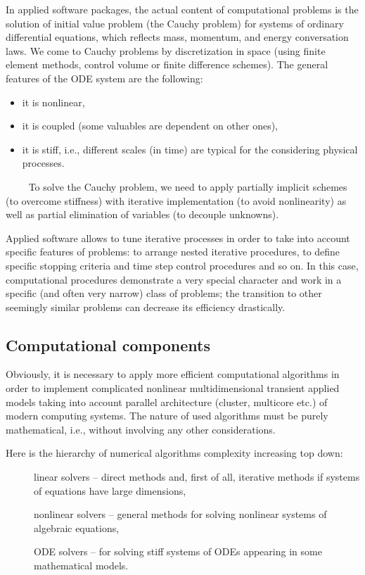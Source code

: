 \documentclass{elsarticle}
\begin{document}
In applied software packages, the actual content of computational problems is the solution of initial value problem 
(the Cauchy problem) for systems of ordinary differential equations, which reflects mass, momentum, and 
energy conversation laws. 
We come to Cauchy problems by discretization in space (using finite element methods, 
control volume or finite difference schemes). 
The general features of the ODE system are the following:
\begin{itemize}
 \item[\textbullet]	it is nonlinear,  
 \item[\textbullet] 	it is coupled  (some valuables are dependent on other ones),
 \item[\textbullet]  it is stiff, i.e., different scales (in time) are typical for the considering physical processes.  
\end{itemize} 
~~~~
To solve the Cauchy problem, we need to apply partially implicit schemes (to overcome stiffness) 
with iterative implementation (to avoid nonlinearity) as well as partial elimination of variables 
(to decouple unknowns). 

Applied software allows to tune iterative processes in order to  take into account specific features of problems: 
to arrange nested iterative procedures, to define specific stopping criteria and  time step control procedures and so on.
In this case, computational procedures demonstrate a very special character and work in a specific 
(and often very narrow) class of problems; the transition to other seemingly similar problems can decrease its efficiency
drastically.

\subsection{Computational components}

Obviously, it is necessary to apply more efficient computational algorithms in order to implement 
complicated nonlinear multidimensional transient applied models taking into account parallel architecture 
(cluster, multicore etc.) of modern computing systems.
The nature of used algorithms must be purely mathematical, i.e., without involving any other considerations.

Here is the hierarchy of numerical algorithms complexity increasing top down:
\begin{description}
 \item[\textbullet] linear solvers -- direct methods and, first of all, iterative methods if systems of equations have large dimensions,  
 \item[\textbullet] nonlinear solvers -- general methods for solving nonlinear systems of algebraic equations,  
 \item[\textbullet] ODE solvers -- for solving stiff systems of ODEs appearing in some mathematical models.
\end{description} 
\end{document}
